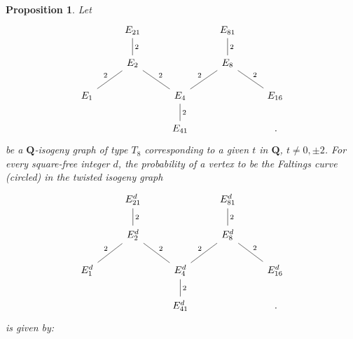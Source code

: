 \documentclass[11pt]{article}
\newtheorem{prop}[defn]{Proposition}
\theoremstyle{definition}
\begin{document}
\begin{prop}
Let 
\[ \begin{tikzcd}
& E_{21} \ar[dash,d,"2"] & & E_{81} \ar[dash,d,"2"] & \\
& E_{2} \ar[dash,swap,dl,"2"] \ar[dash,dr,"2"] & & E_{8} \ar[dash,dl,swap,"2"] \ar[dash,dr,"2"] & \\
 E_1 &  & E_4 \ar[dash,d,"2"] & & E_{16}  \\
 &  & E_{41} & &    \,.
\end{tikzcd}
\]
be a $\mathbf{Q}$-isogeny graph of type $T_8$ corresponding to a given $t$ in $\mathbf{Q}$, $t\ne 0,\pm 2$. For every square-free integer $d$, 
the probability of a vertex
to be the Faltings curve (circled)
in the twisted isogeny graph 
\[ \begin{tikzcd}
& E^d_{21} \ar[dash,d,"2"] & & E^d_{81} \ar[dash,d,"2"] & \\
& E^d_{2} \ar[dash,swap,dl,"2"] \ar[dash,dr,"2"] & & E^d_{8} \ar[dash,dl,swap,"2"] \ar[dash,dr,"2"] & \\
 E^d_1 &  & E^d_4 \ar[dash,d,"2"] & & E^d_{16}  \\
 &  & E^d_{41} & &    \,.
\end{tikzcd}
\]
is given by:

\newpage


\end{prop}
\end{document}
